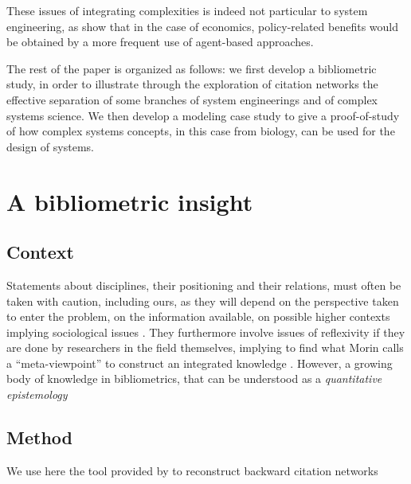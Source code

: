 \documentclass[runningheads,a4paper]{llncs2e/llncs}
\begin{document}
\cite{sheard2009principles}

\cite{durantin2017disruptive} 


These issues of integrating complexities is indeed not particular to system engineering, as \cite{farmer2009economy} show that in the case of economics, policy-related benefits would be obtained by a more frequent use of agent-based approaches. 



The rest of the paper is organized as follows: we first develop a bibliometric study, in order to illustrate through the exploration of citation networks the effective separation of some branches of system engineerings and of complex systems science. We then develop a modeling case study to give a proof-of-study of how complex systems concepts, in this case from biology, can be used for the design of systems.



\section{A bibliometric insight}

\subsection{Context}

Statements about disciplines, their positioning and their relations, must often be taken with caution, including ours, as they will depend on the perspective taken to enter the problem, on the information available, on possible higher contexts implying sociological issues \cite{latour1977rhetorique}. They furthermore involve issues of reflexivity if they are done by researchers in the field themselves, implying to find what Morin calls a ``meta-viewpoint'' to construct an integrated knowledge \cite{edgar1986methode}. However, a growing body of knowledge in bibliometrics, that can be understood as a \emph{quantitative epistemology} \cite{chavalarias2013phylomemetic}

\cite{waltman2010unified}

\subsection{Method}

We use here the tool provided by \cite{raimbault2017exploration} to reconstruct backward citation networks
\end{document}
